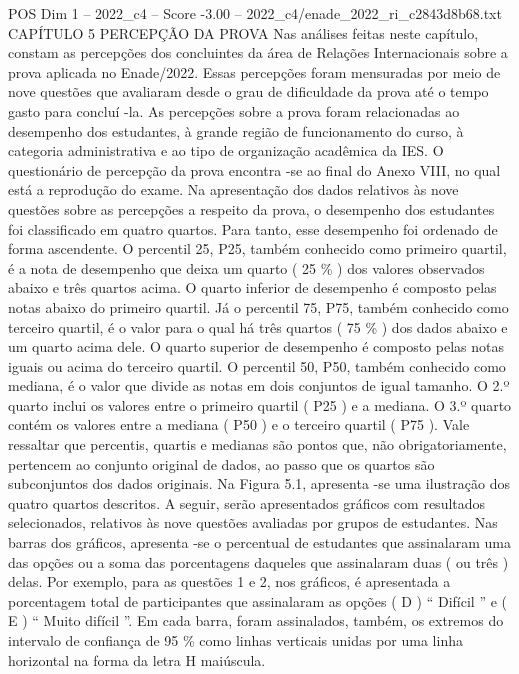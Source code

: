\begin{textsample}{POS Dim 1 – 2022\_c4 – Score -3.00 – 2022\_c4/enade\_2022\_ri\_c2843d8b68.txt}  \label{ex:f1_pos_260}
CAPÍTULO 5 PERCEPÇÃO DA PROVA Nas análises feitas neste capítulo, constam as percepções dos concluintes da área de Relações Internacionais sobre a prova aplicada no Enade/2022.
Essas percepções foram mensuradas por meio de nove questões que avaliaram desde o grau de dificuldade da prova até o tempo gasto para concluí -la.
As percepções sobre a prova foram relacionadas ao desempenho dos estudantes, à grande região de funcionamento do curso, à categoria administrativa e ao tipo de organização acadêmica da IES.
O questionário de percepção da prova encontra -se ao final do Anexo VIII, no qual está a reprodução do exame.
Na apresentação dos dados relativos às nove questões sobre as percepções a respeito da prova, o desempenho dos estudantes foi classificado em quatro quartos.
Para tanto, esse desempenho foi ordenado de forma ascendente.
O percentil 25, P25, também conhecido como primeiro quartil, é a nota de desempenho que deixa um quarto ( 25 \% ) dos valores observados abaixo e três quartos acima.
O quarto inferior de desempenho é composto pelas notas abaixo do primeiro quartil.
Já o percentil 75, P75, também conhecido como terceiro quartil, é o valor para o qual há três quartos ( 75 \% ) dos dados abaixo e um quarto acima dele.
O quarto superior de desempenho é composto pelas notas iguais ou acima do terceiro quartil.
O percentil 50, P50, também conhecido como mediana, é o valor que divide as notas em dois conjuntos de igual tamanho.
O 2.º quarto inclui os valores entre o primeiro quartil ( P25 ) e a mediana.
O 3.º quarto contém os valores entre a mediana ( P50 ) e o terceiro quartil ( P75 ).
Vale ressaltar que percentis, quartis e medianas são pontos que, não obrigatoriamente, pertencem ao conjunto original de dados, ao passo que os quartos são subconjuntos dos dados originais.
Na Figura 5.1, apresenta -se uma ilustração dos quatro quartos descritos.
A seguir, serão apresentados gráficos com resultados selecionados, relativos às nove questões avaliadas por grupos de estudantes.
Nas barras dos gráficos, apresenta -se o percentual de estudantes que assinalaram uma das opções ou a soma das porcentagens daqueles que assinalaram duas ( ou três ) delas.
Por exemplo, para as questões 1 e 2, nos gráficos, é apresentada a porcentagem total de participantes que assinalaram as opções ( D ) “ Difícil ” e ( E ) “ Muito difícil ”.
Em cada barra, foram assinalados, também, os extremos do intervalo de confiança de 95 \% como linhas verticais unidas por uma linha horizontal na forma da letra H maiúscula.

\end{textsample}
